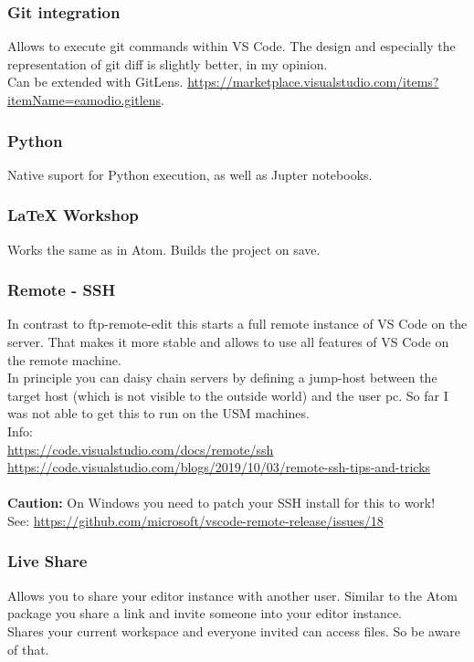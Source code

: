 \documentclass[10pt,a4paper]{article}
\begin{document}
\subsubsection{Git integration}
Allows to execute git commands within VS Code. The design and especially the representation of git diff is slightly better, in my opinion.\\
Can be extended with GitLens. \url{https://marketplace.visualstudio.com/items?itemName=eamodio.gitlens}.

\subsubsection{Python}
Native suport for Python execution, as well as Jupter notebooks.

\subsubsection{LaTeX Workshop}
Works the same as in Atom. Builds the project on save.

\subsubsection{Remote - SSH}
In contrast to ftp-remote-edit this starts a full remote instance of VS Code on the server. That makes it more stable and allows to use all features of VS Code on the remote machine.\\
In principle you can daisy chain servers by defining a jump-host between the target host (which is not visible to the outside world) and the user pc. So far I was not able to get this to run on the USM machines.\\
Info:\\
\url{https://code.visualstudio.com/docs/remote/ssh}\\
\url{https://code.visualstudio.com/blogs/2019/10/03/remote-ssh-tips-and-tricks}\\
\\
\textbf{Caution:} On Windows you need to patch your SSH install for this to work!\\
See: \url{https://github.com/microsoft/vscode-remote-release/issues/18}

\subsubsection{Live Share}
Allows you to share your editor instance with another user. Similar to the Atom package you share a link and invite someone into your editor instance.\\
Shares your current workspace and everyone invited can access files. So be aware of that.
\end{document}
